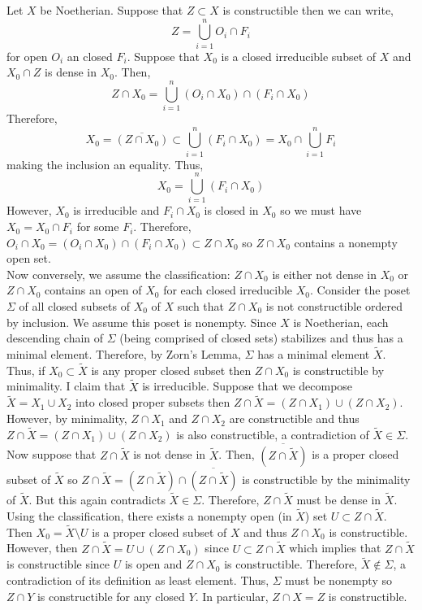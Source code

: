 \documentclass[12pt]{extarticle}
\begin{document}
Let $X$ be Noetherian. Suppose that $Z \subset X$ is constructible then we can write,
\[ Z = \bigcup_{i = 1}^n O_i \cap F_i \]
for open $O_i$ an closed $F_i$. Suppose that $X_0$ is a closed irreducible subset of $X$ and $X_0 \cap Z$ is dense in $X_0$. Then,
\[ Z \cap X_0 = \bigcup_{i = 1}^n (O_i \cap X_0) \cap (F_i \cap X_0) \]
Therefore,
\[ X_0 = \overline{(Z \cap X_0)} \subset \bigcup_{i = 1}^n (F_i \cap X_0) = X_0 \cap \bigcup_{i = 1}^{n} F_i \]
making the inclusion an equality. Thus,
\[ X_0 =  \bigcup_{i = 1}^n (F_i \cap X_0) \]
However, $X_0$ is irreducible and $F_i \cap X_0$ is closed in $X_0$ so we must have $X_0 = X_0 \cap F_i$ for some $F_i$. Therefore, $O_i \cap X_0 = (O_i \cap X_0) \cap (F_i \cap X_0) \subset Z \cap X_0$ so $Z \cap X_0$ contains a nonempty open set.
\bigskip\\
Now conversely, we assume the classification: $Z \cap X_0$ is either not dense in $X_0$ or $Z \cap X_0$ contains an open of $X_0$ for each closed irreducible $X_0$. Consider the poset $\Sigma$ of all closed subsets of $X_0$ of $X$ such that $Z \cap X_0$ is not constructible ordered by inclusion. We assume this poset is nonempty. Since $X$ is Noetherian, each descending chain of $\Sigma$ (being comprised of closed sets) stabilizes and thus has a minimal element. Therefore, by Zorn's Lemma, $\Sigma$ has a minimal element $\tilde{X}$. Thus, if $X_0 \subset \tilde{X}$ is any proper closed subset then $Z \cap X_0$ is constructible by minimality. I claim that $\tilde{X}$ is irreducible. Suppose that we decompose $\tilde{X} = X_1 \cup X_2$ into closed proper subsets then $Z \cap \tilde{X} = (Z \cap X_1) \cup (Z \cap X_2)$. However, by minimality, $Z \cap X_1$ and $Z \cap X_2$ are constructible and thus $Z \cap \tilde{X} = (Z \cap X_1) \cup (Z \cap X_2)$ is also constructible, a contradiction of $\tilde{X} \in \Sigma$. 
\bigskip\\
Now suppose that $Z \cap \tilde{X}$ is not dense in $\tilde{X}$. Then, $\overline{(Z \cap \tilde{X})}$ is a proper closed subset of $\tilde{X}$ so $Z \cap \tilde{X} = (Z \cap \tilde{X}) \cap \overline{(Z \cap \tilde{X})}$ is constructible by the minimality of $\tilde{X}$. But this again contradicts $\tilde{X} \in \Sigma$. Therefore, $Z \cap \tilde{X}$ must be dense in $\tilde{X}$. Using the classification, there exists a nonempty open (in $\tilde{X}$) set $U \subset Z \cap \tilde{X}$. Then $X_0 = \tilde{X} \setminus U$ is a proper closed subset of $X$ and thus $Z \cap X_0$ is constructible. However, then $Z \cap \tilde{X} = U \cup (Z \cap X_0)$ since $U \subset Z \cap \tilde{X}$ which implies that $Z \cap \tilde{X}$ is constructible since $U$ is open and $Z \cap X_0$ is constructible. Therefore, $\tilde{X} \notin \Sigma$, a contradiction of its definition as least element. Thus, $\Sigma$ must be nonempty so $Z \cap Y$ is constructible for any closed $Y$. In particular, $Z \cap X = Z$ is constructible.
\end{document}
